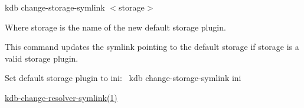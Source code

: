 {\ttfamily kdb change-\/storage-\/symlink $<$storage$>$}

Where {\ttfamily storage} is the name of the new default storage plugin.

This command updates the symlink pointing to the default storage if {\ttfamily storage} is a valid storage plugin.

Set default storage plugin to ini\+:~\newline
 {\ttfamily kdb change-\/storage-\/symlink ini}


\begin{DoxyItemize}
\item \hyperlink{doc_help_kdb-change-resolver-symlink_md}{kdb-\/change-\/resolver-\/symlink(1)} 
\end{DoxyItemize}